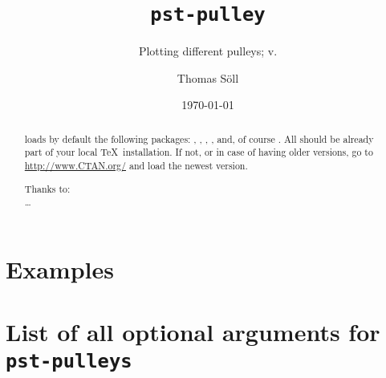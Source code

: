 \documentclass[11pt,english,BCOR10mm,DIV12,bibliography=totoc,parskip=false,
   smallheadings, headexclude,footexclude,oneside]{pst-doc}
\let\pstPulleyFV\fileversion
\begin{document}
\title{\texttt{pst-pulley}}
\subtitle{Plotting different pulleys; v.\pstPulleyFV}
\author{Thomas Söll}
\docauthor{}
\date{\today}
\maketitle

\tableofcontents
{}

\clearpage

\begin{abstract}
\noindent
{} loads by default the following packages: , 
, , , and, of course .
All should be already part of your local \TeX\ installation. If not, or in case
of having older versions, go to \url{http://www.CTAN.org/} and load the newest version.

\vfill\noindent
Thanks to: \\
\ldots


\end{abstract}

\clearpage
\section{Examples}

\begin{center}
\pspulleys[grid,N=1,M=60,h=35]
\end{center}

\begin{center}
\pspulleys[N=2,M=60,h=30,Dx=0.41]
\end{center}

\begin{center}
\pspulleys[N=3,M=60,h=25]
\end{center}

\begin{center}
\pspulleys[N=4,M=60,h=20]
\end{center}

\begin{center}
\pspulleys[N=5,M=60,h=15]
\end{center}

\begin{center}
\pspulleys[N=6,M=60,h=10]
\end{center}


\clearpage
\section{List of all optional arguments for \texttt{pst-pulleys}}





\bgroup
\raggedright
\nocite{*}


\egroup

\printindex
\end{document}
